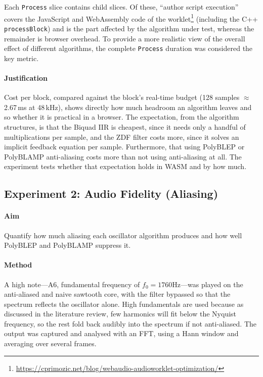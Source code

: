 Each \texttt{Process} slice contains child slices. Of these, ``author script execution'' covers the JavaScript and WebAssembly code of the worklet\footnote{\url{https://cprimozic.net/blog/webaudio-audioworklet-optimization/}} (including the C++ \texttt{processBlock}) and is the part affected by the algorithm under test, whereas the remainder is browser overhead. To provide a more realistic view of the overall effect of different algorithms, the complete \texttt{Process} duration was considered the key metric.

\paragraph{Justification} Cost per block, compared against the block's real-time budget (128 samples $\approx$ 2.67\,ms at 48\,kHz), shows directly how much headroom an algorithm leaves and so whether it is practical in a browser. The expectation, from the algorithm structures, is that the Biquad IIR is cheapest, since it needs only a handful of multiplications per sample, and the ZDF filter costs more, since it solves an implicit feedback equation per sample. Furthermore, that using PolyBLEP or PolyBLAMP anti-aliasing costs more than not using anti-aliasing at all. The experiment tests whether that expectation holds in WASM and by how much.

\subsection{Experiment 2: Audio Fidelity (Aliasing)}
\label{sec:alias}
\noindent
\paragraph{Aim} Quantify how much aliasing each oscillator algorithm produces and how well PolyBLEP and PolyBLAMP suppress it.

\paragraph{Method} A high note---A6, fundamental frequency of $f_0 = 1760$Hz---was played on the anti-aliased and naive sawtooth core, with the filter bypassed so that the spectrum reflects the oscillator alone. High fundamentals are used because as discussed in the literature review, few harmonics will fit below the Nyquist frequency, so the rest fold back audibly into the spectrum if not anti-aliased. The output was captured and analysed with an FFT, using a Hann window and averaging over several frames. 

